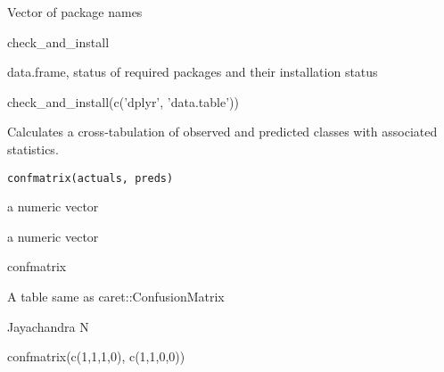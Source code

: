 \documentclass[a4paper]{book}
\begin{document}
%
\begin{Arguments}
\begin{ldescription}
\item[\code{packs}] Vector of package names
\end{ldescription}
\end{Arguments}
%
\begin{Details}\relax
check\_and\_install
\end{Details}
%
\begin{Value}
data.frame, status of required packages and their installation status
\end{Value}
%
\begin{Examples}
\begin{ExampleCode}
check_and_install(c('dplyr', 'data.table'))
\end{ExampleCode}
\end{Examples}
%
\begin{Description}\relax
Calculates a cross-tabulation of observed and predicted classes with associated statistics.
\end{Description}
%
\begin{Usage}
\begin{verbatim}
confmatrix(actuals, preds)
\end{verbatim}
\end{Usage}
%
\begin{Arguments}
\begin{ldescription}
\item[\code{actuals}] a numeric vector

\item[\code{preds}] a numeric vector
\end{ldescription}
\end{Arguments}
%
\begin{Details}\relax
confmatrix
\end{Details}
%
\begin{Value}
A table same as caret::ConfusionMatrix
\end{Value}
%
\begin{Author}\relax
Jayachandra N
\end{Author}
%
\begin{Examples}
\begin{ExampleCode}
confmatrix(c(1,1,1,0), c(1,1,0,0))
\end{ExampleCode}
\end{Examples}
\end{document}
